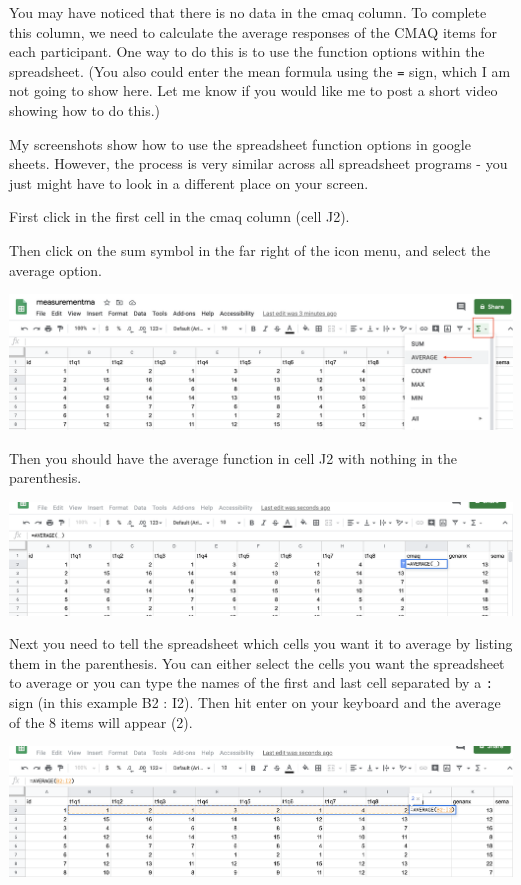 \documentclass[
]{book}
\begin{document}
You may have noticed that there is no data in the cmaq column. To complete this column, we need to calculate the average responses of the CMAQ items for each participant. One way to do this is to use the function options within the spreadsheet. (You also could enter the mean formula using the \texttt{=} sign, which I am not going to show here. Let me know if you would like me to post a short video showing how to do this.)

My screenshots show how to use the spreadsheet function options in google sheets. However, the process is very similar across all spreadsheet programs - you just might have to look in a different place on your screen.

First click in the first cell in the cmaq column (cell J2).

Then click on the sum symbol in the far right of the icon menu, and select the average option.

\includegraphics{img/averagefun.png}

Then you should have the average function in cell J2 with nothing in the parenthesis.

\includegraphics{img/averagefun2.png}

Next you need to tell the spreadsheet which cells you want it to average by listing them in the parenthesis. You can either select the cells you want the spreadsheet to average or you can type the names of the first and last cell separated by a \texttt{:} sign (in this example B2 : I2). Then hit enter on your keyboard and the average of the 8 items will appear (2).

\includegraphics{img/averagefun3.png}
\end{document}
